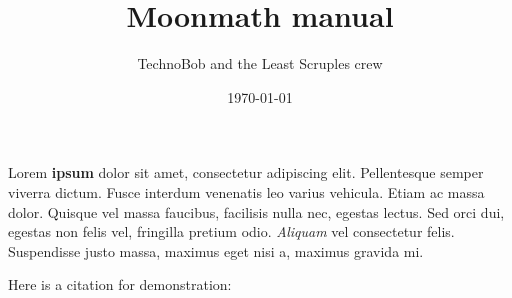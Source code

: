 \documentclass[a4paper, 12pt]{scrreprt}
\title{Moonmath manual}
\author{TechnoBob and the Least Scruples crew}
\date{\today}
\theoremstyle{plain}
\begin{document}
\maketitle

Lorem \textbf{ipsum} dolor sit amet, consectetur adipiscing elit. Pellentesque semper viverra dictum.  Fusce interdum venenatis leo varius vehicula. Etiam ac massa dolor. Quisque vel massa faucibus, facilisis nulla nec, egestas lectus. Sed orci dui, egestas non felis vel, fringilla pretium odio. \textit{Aliquam} vel consectetur felis. Suspendisse justo massa, maximus eget nisi a, maximus gravida mi.

Here is a citation for demonstration: \cite{lamport1982the}










\end{document}

